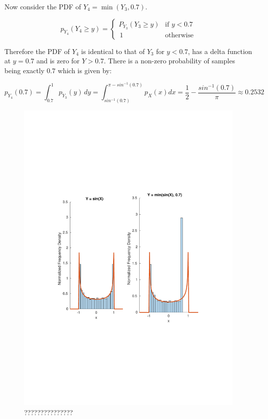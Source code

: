 \documentclass[12pt]{article}
\begin{document}
Now consider the PDF of $Y_4 = \min{(Y_3, 0.7)}$.

\begin{equation}
  p_{Y_4}(Y_4 \ge y) =
  \begin{cases} 
    P_{Y_3}(Y_3 \ge y) &\mbox{if } y < 0.7 \\
    \, 1 &\mbox{otherwise}
  \end{cases}
\end{equation}

Therefore the PDF of $Y_4$ is identical to that of $Y_3$ for $y < 0.7$, has a delta function at $y = 0.7$ and is zero for $Y > 0.7$. There is a non-zero probability of samples being exactly $0.7$ which is given by:

$$
  p_{Y_4}(0.7) = 
  \int _ {0.7} ^ 1 p_{Y_3}(y) \, dy = 
  \int _ {sin^{-1}(0.7)} ^ {\pi - sin^{-1}(0.7)} p_X(x) dx =
  \frac 1 2 - \frac {sin^{-1}(0.7)} \pi \approx
  0.2532
$$

\begin{figure}[!htb]
\includegraphics[width=\textwidth]{figures/uniform-sine-transform.pdf}
  \caption{???????????????}
  \label{fig:sine-function}
\end{figure}
\end{document}
